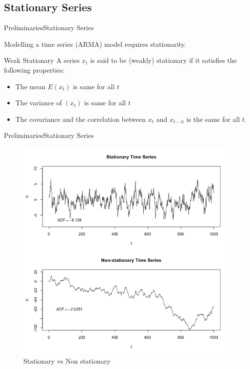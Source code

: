 \documentclass{beamer}
\begin{document}
\subsection{Stationary Series}
\begin{frame}{Preliminaries}{Stationary Series}

Modelling a time series (ARMA) model requires stationarity. 


\pause
\begin{block}{Weak Stationary}
A series $ x_t $ is said to be (weakly) stationary if it satisfies the following properties:
\begin{itemize}
\item The mean $ E(x_t) $ is same for all $ t $
\item The variance  of $ (x_t) $ is same for all $ t $	
\item The covariance and the correlation between $ x_t $ and $ x_{t-h} $ is the same for all $ t $.
\end{itemize}
\end{block}
\end{frame}


\begin{frame}{Preliminaries}{Stationary Series} 	
\begin{figure}
\centering
\includegraphics[width=0.6\linewidth]{Stationarycomparison}
\caption{Stationary vs Non stationary}
\label{}
\end{figure}
\end{frame}
		
\end{document}
